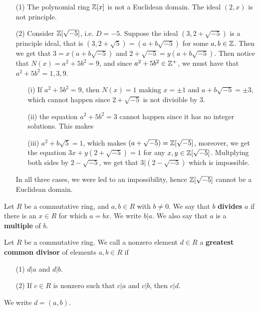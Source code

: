 \begin{example}\label{example_6.2}
  \begin{enumerate}
    \item[(1)] The polynomial ring $\mathbb{Z}[x]$ is not a Euclidean domain. The
      ideal $(2,x)$ is not principle.

    \item[(2)] Consider $\mathbb{Z}[\sqrt{-5}]$, i.e. $D=-5$. Suppose the ideal
      $(3,2+\sqrt{-5})$ is a principle ideal, that is
      $(3,2+\sqrt{5})=(a+b\sqrt{-5})$ for some $a,b \in \mathbb{Z}$. Then we get
      that $3=x(a+b\sqrt{-5})$ and $2+\sqrt{-5}=y(a+b\sqrt{-5})$. Then
      notice that $N(x)=a^2+5b^2=9$, and since  $a^2+5b^2 \in \mathbb{Z}^+$, we
      must have that $a^2+5b^2=1,3,9$.
      \begin{enumerate}
        \item[(i)] If $a^2+5b^2=9$, then $N(x)=1$ making $x=\pm 1$ and
          $a+b\sqrt{-5}=\pm3$, which cannot happen since $2+\sqrt{-5}$ is
          not divisible by $3$.

        \item[(ii)] the equation $a^2+5b^2=3$ cannot happen since it has no
          integer solutions. This makes

        \item[(iii)] $a^2+b\sqrt{5}=1$, which makes
          $(a+\sqrt{-5})=\mathbb{Z}[\sqrt{-5}]$, moreover, we get the equation
          $3x+y(2+\sqrt{-5})=1$ for any $x,y \in \mathbb{Z}[\sqrt{-5}]$.
          Multplying both sides by $2-\sqrt{-5}$, we get that
          $3|(2-\sqrt{-5})$ which is impossible.
      \end{enumerate}
      In all three cases, we were led to an impossibility, hence
      $\mathbb{Z}[\sqrt{-5}]$ cannot be a Euclidean domain.
  \end{enumerate}
\end{example}

\begin{definition}
  Let $R$ be a commutative ring, and  $a,b \in R$ with  $b \neq 0$. We say
  that $b$ \textbf{divides} $a$ if there is an  $x \in R$ for which  $a=bx$.
  We write  $b|a$. We also say that $a$ is a \textbf{multiple} of $b$.
\end{definition}

\begin{definition}
  Let $R$ be a commutative ring. We call a nonzero element  $d \in R$ a
  \textbf{greatest common divisor} of elements $a,b \in R$ if
  \begin{enumerate}
    \item[(1)] $d|a$ and  $d|b$.

    \item[(2)] If $c \in R$ is nonzero such that  $c|a$ and  $c|b$, then
      $c|d$.
  \end{enumerate}
  We write $d=(a,b)$.
\end{definition}

